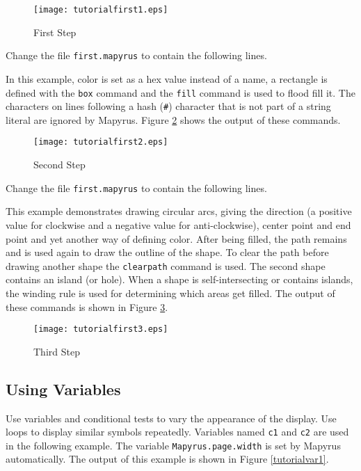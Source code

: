 \begin{figure}[htb]
\texttt{[image: tutorialfirst1.eps]}
\caption{First Step}
\label{tutorialfirst1}
\end{figure}


Change the file \texttt{first.mapyrus} to contain the following lines.



In this example, color is set as a hex value instead of a name,
a rectangle is defined with the \texttt{box} command
and the \texttt{fill} command is used to
flood fill it.
The characters on lines following a hash (\texttt{\#}) character that
is not part of a string literal are ignored by Mapyrus.
Figure \ref{tutorialfirst2} shows the output of these commands.

\begin{figure}[htb]
\texttt{[image: tutorialfirst2.eps]}
\caption{Second Step}
\label{tutorialfirst2}
\end{figure}

Change the file \texttt{first.mapyrus} to contain the following lines.



This example demonstrates drawing circular arcs,
giving the direction (a positive value for clockwise and a negative
value for anti-clockwise), center point and end point and
yet another way of defining color.
After being filled, the path remains and is used again to draw the outline
of the shape.
To clear the path before drawing another shape the
\texttt{clearpath}
command is used.
The second shape contains an island (or hole).  When a shape is
self-intersecting or contains islands, the winding rule is
used for determining which areas get filled.
The output of these commands is shown in Figure \ref{tutorialfirst3}.

\begin{figure}[htb]
\texttt{[image: tutorialfirst3.eps]}
\caption{Third Step}
\label{tutorialfirst3}
\end{figure}

\subsection{Using Variables}

Use variables and conditional tests to vary the appearance
of the display.
Use loops to display similar symbols repeatedly.
Variables named \texttt{c1} and \texttt{c2} are used in the
following example.  The variable
\texttt{Mapyrus.page.width}
is set by Mapyrus automatically.
The output of this example is shown in Figure \ref{tutorialvar1}.

